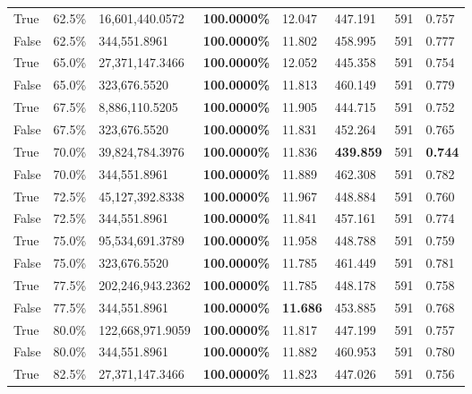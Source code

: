 \begin{table}[H]
\begin{tabular}{lllrllll}
\cline{1-8}
True & 62.5\% & 16,601,440.0572 & \bfseries \color{red} 100.0000\% & 12.047 & 447.191 & 591 & 0.757 \\
\cline{1-8}
False & 62.5\% & 344,551.8961 & \bfseries \color{red} 100.0000\% & 11.802 & 458.995 & 591 & 0.777 \\
\cline{1-8}
True & 65.0\% & 27,371,147.3466 & \bfseries \color{red} 100.0000\% & 12.052 & 445.358 & 591 & 0.754 \\
\cline{1-8}
False & 65.0\% & 323,676.5520 & \bfseries \color{red} 100.0000\% & 11.813 & 460.149 & 591 & 0.779 \\
\cline{1-8}
True & 67.5\% & 8,886,110.5205 & \bfseries \color{red} 100.0000\% & 11.905 & 444.715 & 591 & 0.752 \\
\cline{1-8}
False & 67.5\% & 323,676.5520 & \bfseries \color{red} 100.0000\% & 11.831 & 452.264 & 591 & 0.765 \\
\cline{1-8}
True & 70.0\% & 39,824,784.3976 & \bfseries \color{red} 100.0000\% & 11.836 & \bfseries \color{red} 439.859 & 591 & \bfseries \color{red} 0.744 \\
\cline{1-8}
False & 70.0\% & 344,551.8961 & \bfseries \color{red} 100.0000\% & 11.889 & 462.308 & 591 & 0.782 \\
\cline{1-8}
True & 72.5\% & 45,127,392.8338 & \bfseries \color{red} 100.0000\% & 11.967 & 448.884 & 591 & 0.760 \\
\cline{1-8}
False & 72.5\% & 344,551.8961 & \bfseries \color{red} 100.0000\% & 11.841 & 457.161 & 591 & 0.774 \\
\cline{1-8}
True & 75.0\% & 95,534,691.3789 & \bfseries \color{red} 100.0000\% & 11.958 & 448.788 & 591 & 0.759 \\
\cline{1-8}
False & 75.0\% & 323,676.5520 & \bfseries \color{red} 100.0000\% & 11.785 & 461.449 & 591 & 0.781 \\
\cline{1-8}
True & 77.5\% & 202,246,943.2362 & \bfseries \color{red} 100.0000\% & 11.785 & 448.178 & 591 & 0.758 \\
\cline{1-8}
False & 77.5\% & 344,551.8961 & \bfseries \color{red} 100.0000\% & \bfseries \color{red} 11.686 & 453.885 & 591 & 0.768 \\
\cline{1-8}
True & 80.0\% & 122,668,971.9059 & \bfseries \color{red} 100.0000\% & 11.817 & 447.199 & 591 & 0.757 \\
\cline{1-8}
False & 80.0\% & 344,551.8961 & \bfseries \color{red} 100.0000\% & 11.882 & 460.953 & 591 & 0.780 \\
\cline{1-8}
True & 82.5\% & 27,371,147.3466 & \bfseries \color{red} 100.0000\% & 11.823 & 447.026 & 591 & 0.756 \\

\end{tabular}
\end{table}
